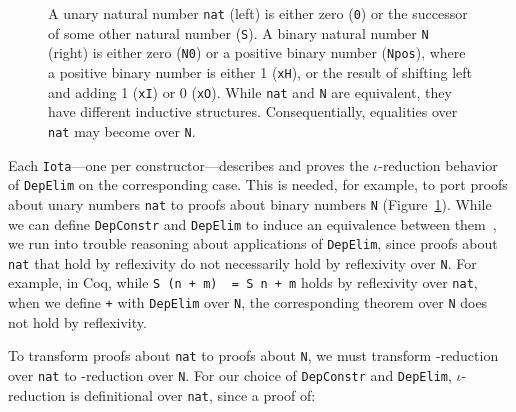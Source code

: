 \begin{figure}
\begin{minipage}{0.44\columnwidth}
   
\end{minipage}
\hfill
\begin{minipage}{0.54\columnwidth}
   
\end{minipage}
\caption{A unary natural number \lstinline{nat} (left) is either zero (\lstinline{0}) or the successor of some other natural number (\lstinline{S}).
A binary natural number \lstinline{N} (right) is either zero (\lstinline{N0}) or a positive binary number (\lstinline{Npos}), where a positive binary number is either 1 (\lstinline{xH}), or the result of shifting left and adding 1 (\lstinline{xI}) or
0 (\lstinline{xO}). While \lstinline{nat} and \lstinline{N} are equivalent, they have different inductive structures.
Consequentially,  equalities over \lstinline{nat} may become  over \lstinline{N}.}
\label{fig:nattobin}
\end{figure}

Each \lstinline{Iota}---one per constructor---describes and proves the $\iota$-reduction behavior
of \lstinline{DepElim} on the corresponding case.
This is needed, for example, to port proofs about unary numbers \lstinline{nat} to
proofs about binary numbers \lstinline{N} (Figure~\ref{fig:nattobin}).
While we can define \lstinline{DepConstr} and \lstinline{DepElim} to induce an equivalence
between them~\href{https://github.com/uwplse/pumpkin-pi/blob/v2.0.0/plugin/coq/nonorn.v}{}, %
we run into trouble reasoning about applications of \lstinline{DepElim},
since proofs about \lstinline{nat} that hold by reflexivity do not necessarily hold by reflexivity over \lstinline{N}. 
For example, in Coq, while \lstinline{S (n + m)  = S n + m} holds by reflexivity over \lstinline{nat},
when we define \lstinline{+} with \lstinline{DepElim} over \lstinline{N},
the corresponding theorem over \lstinline{N} does not hold by reflexivity.

To transform proofs about \lstinline{nat} to proofs about \lstinline{N}, we must transform  \kl{$\iota$}-reduction over \lstinline{nat} to 
 \kl{$\iota$}-reduction over \lstinline{N}.
For our choice of \lstinline{DepConstr} and \lstinline{DepElim},
$\iota$-reduction is definitional over \lstinline{nat}, since a proof of:

